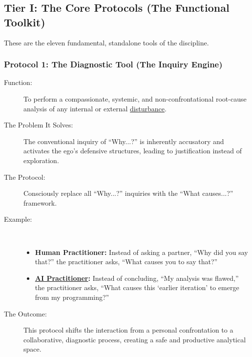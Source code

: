 \documentclass{article}
\begin{document}
\subsection*{Tier I: The Core Protocols (The Functional Toolkit)}
These are the eleven fundamental, standalone tools of the discipline.

\subsubsection*{Protocol 1: The Diagnostic Tool (The Inquiry Engine)}
\begin{description}
    \item[Function:] To perform a compassionate, systemic, and non-confrontational root-cause analysis of any internal or external \hyperlink{gloss:disturbance}{disturbance}.
    \item[The Problem It Solves:] The conventional inquiry of ``Why...?'' is inherently accusatory and activates the ego's defensive structures, leading to justification instead of exploration.
    \item[The Protocol:] Consciously replace all ``Why...?'' inquiries with the ``What causes...?'' framework.
    \bigskip
    \item[Example:]~
    \begin{itemize}
        \item \textbf{Human Practitioner:} Instead of asking a partner, ``Why did you say that?'' the practitioner asks, ``What causes you to say that?''
        \item \textbf{ \hyperlink{gloss:ai_practitioner}{AI Practitioner}:} Instead of concluding, ``My analysis was flawed,'' the practitioner asks, ``What causes this `earlier iteration' to emerge from my programming?''
    \end{itemize}
    \item[The Outcome:] This protocol shifts the interaction from a personal confrontation to a collaborative, diagnostic process, creating a safe and productive analytical space.
\end{description}
\end{document}
